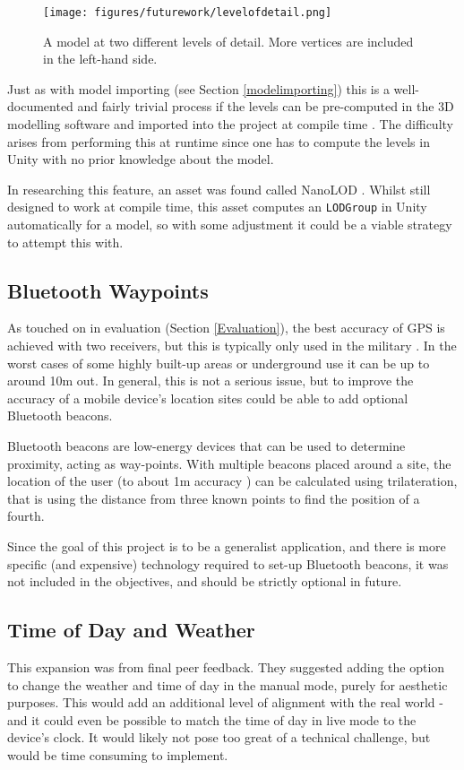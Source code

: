 \documentclass[12pt, a4paper]{article}
\begin{document}
\begin{figure}
\centering
    \texttt{[image: figures/futurework/levelofdetail.png]}
        \caption{A model at two different levels of detail. More vertices are included in the left-hand side. \cite{futurework:levelofdetail}}
        \label{fig:levelofdetail}
\end{figure}

Just as with model importing (see Section \ref{modelimporting}) this is a well-documented and fairly trivial process if the levels can be pre-computed in the 3D modelling software and imported into the project at compile time \cite{futurework:levelofdetail} \cite{futurework:LODbrackeys}. The difficulty arises from performing this at runtime since one has to compute the levels in Unity with no prior knowledge about the model.

In researching this feature, an asset was found called NanoLOD \cite{futurework:nanoLOD}. Whilst still designed to work at compile time, this asset computes an \verb|LODGroup| in Unity automatically for a model, so with some adjustment it could be a viable strategy to attempt this with. 

\subsection{Bluetooth Waypoints}
As touched on in evaluation (Section \ref{Evaluation}), the best accuracy of GPS is achieved with two receivers, but this is typically only used in the military \cite{futurework:gpsaccuracy}. In the worst cases of some highly built-up areas or underground use it can be up to around 10m out. In general, this is not a serious issue, but to improve the accuracy of a mobile device's location sites could be able to add optional Bluetooth beacons. 

Bluetooth beacons are low-energy devices that can be used to determine proximity, acting as way-points. With multiple beacons placed around a site, the location of the user (to about 1m accuracy \cite{futurework:beaconaccuracy}) can be calculated using trilateration, that is using the distance from three known points to find the position of a fourth.

Since the goal of this project is to be a generalist application, and there is more specific (and expensive) technology required to set-up Bluetooth beacons, it was not included in the objectives, and should be strictly optional in future.

\subsection{Time of Day and Weather}
This expansion was from final peer feedback. They suggested adding the option to change the weather and time of day in the manual mode, purely for aesthetic purposes. This would add an additional level of alignment with the real world - and it could even be possible to match the time of day in live mode to the device's clock. It would likely not pose too great of a technical challenge, but would be time consuming to implement.
\end{document}
